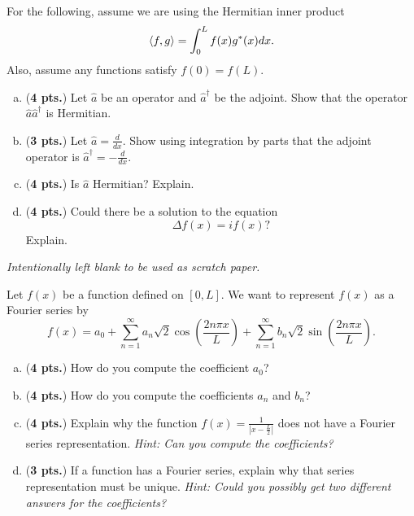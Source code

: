 \documentclass[12pt]{amsbook}
\begin{document}
\newpage
\begin{problem}
For the following, assume we are using the Hermitian inner product
\[
\left\langle f, g\right\rangle = \int_0^L f(x)g^*(x)dx.
\]
Also, assume any functions satisfy $f(0)=f(L)$.
\begin{enumerate}[(a)]
	\item (\textbf{4 pts.}) Let $\hat{a}$ be an operator and $\hat{a}^\dagger$ be the adjoint. Show that the operator $\hat{a}\hat{a}^\dagger$ is Hermitian.
	\vspace*{4cm}
	
	\item (\textbf{3 pts.}) Let $\hat{a} = \frac{d}{dx}$. Show using integration by parts that the adjoint operator is $\hat{a}^\dagger  = -\frac{d}{dx}$.
	\vspace*{5cm}
	
	\item (\textbf{4 pts.}) Is $\hat{a}$ Hermitian? Explain.
	\vspace*{4cm}
	
	\item (\textbf{4 pts.}) Could there be a solution to the equation
	\[
	\Delta f(x) = i f(x)?
	\]
	Explain.
\end{enumerate}
\end{problem}

\newpage
\emph{Intentionally left blank to be used as scratch paper.}\\


\newpage
\begin{problem} Let $f(x)$ be a function defined on $[0,L]$.  We want to represent $f(x)$ as a Fourier series by
\[
f(x) = a_0 + \sum_{n=1}^\infty a_n \sqrt{2} \cos\left(\frac{2n \pi x}{L}\right) + \sum_{n=1}^\infty b_n \sqrt{2} \sin\left(\frac{2n\pi x}{L}\right).
\]
\begin{enumerate}[(a)]
	\item (\textbf{4 pts.}) How do you compute the coefficient $a_0$?
	\vspace*{4cm}
	
	\item (\textbf{4 pts.}) How do you compute the coefficients $a_n$ and $b_n$?
	\vspace*{4cm}
	
	\item (\textbf{4 pts.}) Explain why the function $f(x) = \frac{1}{\left|x-\frac{L}{2}\right|}$ does not have a Fourier series representation. \emph{Hint: Can you compute the coefficients?}
	\vspace*{4cm}
	
	\item (\textbf{3 pts.}) If a function has a Fourier series, explain why that series representation must be unique. \emph{Hint: Could you possibly get two different answers for the coefficients?}
\end{enumerate}
\end{problem}
\end{document}
